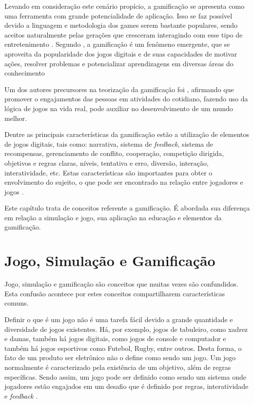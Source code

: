 \documentclass[
	12pt,				%
	oneside,			%
	a4paper,			%
	english,			%
	french,				%
	spanish,			%
	brazil,				%
	]{abntex2}
\begin{document}
Levando em consideração este cenário propício, a gamificação se apresenta como uma ferramenta com grande potencialidade de aplicação. Isso se faz possível devido a linguagem e metodologia dos games serem bastante populares, sendo aceitos naturalmente pelas gerações que cresceram interagindo com esse tipo de entretenimento \cite{fardo2013gamificaccao}. Segundo \citet{deterding2011game}, a gamificação é um fenômeno emergente, que se aproveita da popularidade dos jogos digitais e de suas capacidades de motivar ações, resolver problemas e potencializar aprendizagens em diversas áreas do conhecimento

Um dos autores precursores na teorização da gamificação foi \citet{mcgonigal2011reality}, afirmando que promover o engajamentos das pessoas em atividades do cotidiano, fazendo uso da lógica de jogos na vida real, pode auxiliar no desenvolvimento de um mundo melhor.

Dentre as principais características da gamificação estão a utilização de elementos de jogos digitais, tais como: narrativa, sistema de \textit{feedback}, sistema de recompensas, gerenciamento de conflito, cooperação, competição dirigida, objetivos e regras claras, níveis, tentativa e erro, diversão, interação, interatividade, etc. Estas características são importantes para obter o envolvimento do sujeito, o que pode ser encontrado na relação entre jogadores e jogos \cite{deterding2011game}.

Este capítulo trata de conceitos referente a gamificação. É abordada sua diferença em relação a simulação e jogo, sua aplicação na educação e elementos da gamificação.

\section{Jogo, Simulação e Gamificação}

Jogo, simulação e gamificação são conceitos que muitas vezes são confundidos. Esta confusão acontece por estes conceitos compartilharem características comuns.

Definir o que é um jogo não é uma tarefa fácil devido a grande quantidade e diversidade de jogos existentes. Há, por exemplo, jogos de tabuleiro, como xadrez e damas, também há jogos digitais, como jogos de console e computador e também há jogos esportivos como Futebol, Rugby, entre outros. Desta forma, o fato de um produto ser eletrônico não o define como sendo um jogo. Um jogo normalmente é caracterizado pela existência de um objetivo, além de regras específicas. Sendo assim, um jogo pode ser definido como sendo um sistema onde jogadores estão engajados em um desafio que é definido por regras, interatividade e \textit{feedback} \cite{kaap:2014}. 
\end{document}
